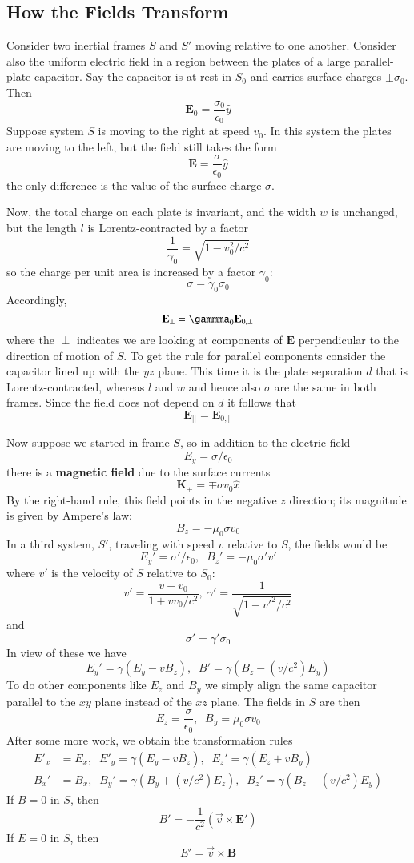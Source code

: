 \subsection{How the Fields Transform}

Consider two inertial frames $S$ and $S'$ moving relative to one another. Consider also the uniform electric field in a region between the plates of a large parallel-plate capacitor. Say the capacitor is at rest in $S_0$ and carries surface charges $\pm \sigma_0$. Then $$\mathbf{E}_0 = \frac{\sigma_0}{\epsilon_0}\hat{y}$$
Suppose system $S$ is moving to the right at speed $v_0$. In this system the plates are moving to the left, but the field still takes the form $$\mathbf{E} = \frac{\sigma}{\epsilon_0}\hat{y}$$
the only difference is the value of the surface charge $\sigma$.

Now, the total charge on each plate is invariant, and the width $w$ is unchanged, but the length $l$ is Lorentz-contracted by a factor $$\frac{1}{\gamma_0} = \sqrt{1-v_0^2/c^2}$$
so the charge per unit area is increased by a factor $\gamma_0$: $$\sigma = \gamma_0\sigma_0$$
Accordingly, $$\mathbf{E}_{\perp} = \gammma_0\mathbf{E}_{0,\perp}$$
where the $\perp$ indicates we are looking at components of $\mathbf{E}$ perpendicular to the direction of motion of $S$. To get the rule for parallel components consider the capacitor lined up with the $yz$ plane. This time it is the plate separation $d$ that is Lorentz-contracted, whereas $l$ and $w$ and hence also $\sigma$ are the same in both frames. Since the field does not depend on $d$ it follows that $$\mathbf{E}_{||} = \mathbf{E}_{0,||}$$

Now suppose we started in frame $S$, so in addition to the electric field $$E_y = \sigma/\epsilon_0$$
there is a \textbf{magnetic field} due to the surface currents $$\mathbf{K}_{\pm} = \mp\sigma v_0\hat{x}$$
By the right-hand rule, this field points in the negative $z$ direction; its magnitude is given by Ampere's law: $$B_z = -\mu_0\sigma v_0$$
In a third system, $S'$, traveling with speed $v$ relative to $S$, the fields would be $$E_y' = \sigma'/\epsilon_0,\;\;B_z' = -\mu_0\sigma'v'$$
where $v'$ is the velocity of $S$ relative to $S_0$: $$v' = \frac{v+v_0}{1+vv_0/c^2},\;\gamma' = \frac{1}{\sqrt{1-{v'}^2/c^2}}$$
and $$\sigma' = \gamma'\sigma_0$$
In view of these we have $$E_y' = \gamma(E_y - vB_z),\;\;B' = \gamma(B_z - (v/c^2)E_y)$$
To do other components like $E_z$ and $B_y$ we simply align the same capacitor parallel to the $xy$ plane instead of the $xz$ plane. The fields in $S$ are then $$E_z = \frac{\sigma}{\epsilon_0},\;\;B_y = \mu_0\sigma v_0$$
After some more work, we obtain the transformation rules \begin{align*}
    E'_x &= E_x,\;\;E'_y = \gamma(E_y-vB_z),\;\; E_z' = \gamma(E_z+vB_y) \\
    B_x' &= B_x,\;\; B_y'= \gamma(B_y+(v/c^2)E_z),\;\;B_z' = \gamma(B_z-(v/c^2)E_y)
\end{align*}
If $B = 0$ in $S$, then $$B' = -\frac{1}{c^2}(\vec{v}\times \mathbf{E}')$$
If $E = 0$ in $S$, then $$E' = \vec{v}\times \mathbf{B}$$



